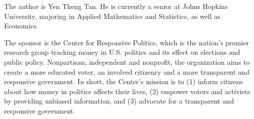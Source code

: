 

The author is Yen Theng Tan. He is currently a senior at Johns Hopkins University, majoring in Applied Mathematics and Statistics, as well as Economics. 



The sponsor is the Center for Responsive Politics, which is the nation's premier research group tracking money in U.S. politics and its effect on elections and public policy. Nonpartisan, independent and nonprofit, the organization aims to create a more educated voter, an involved citizenry and a more transparent and responsive government. In short, the Center's mission is to (1) inform citizens about how money in politics affects their lives, (2) empower voters and activists by providing unbiased information, and (3) advocate for a transparent and responsive government.